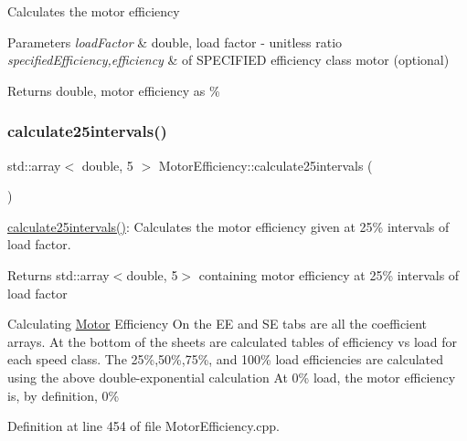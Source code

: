 Calculates the motor efficiency 
\begin{DoxyParams}{Parameters}
{\em load\+Factor} & double, load factor -\/ unitless ratio \\
\hline
{\em specified\+Efficiency,efficiency} & of S\+P\+E\+C\+I\+F\+I\+ED efficiency class motor (optional) \\
\hline
\end{DoxyParams}
\begin{DoxyReturn}{Returns}
double, motor efficiency as \% 
\end{DoxyReturn}
\mbox{\label{class_motor_efficiency_a4135d26efe506365d9ecb7c15f43f35d}} 
\subsubsection{\texorpdfstring{calculate25intervals()}{calculate25intervals()}\hspace{0.1cm}{\footnotesize\ttfamily [1/3]}}
{\footnotesize\ttfamily std\+::array$<$ double, 5 $>$ Motor\+Efficiency\+::calculate25intervals (\begin{DoxyParamCaption}{ }\end{DoxyParamCaption})}

\hyperlink{class_motor_efficiency_a4135d26efe506365d9ecb7c15f43f35d}{calculate25intervals()}\+: Calculates the motor efficiency given at 25\% intervals of load factor. \begin{DoxyReturn}{Returns}
std\+::array$<$double, 5$>$ containing motor efficiency at 25\% intervals of load factor 
\end{DoxyReturn}
Calculating \hyperlink{struct_motor}{Motor} Efficiency On the EE and SE tabs are all the coefficient arrays. At the bottom of the sheets are calculated tables of efficiency vs load for each speed class. The 25\%,50\%,75\%, and 100\% load efficiencies are calculated using the above double-\/exponential calculation At 0\% load, the motor efficiency is, by definition, 0\%

Definition at line 454 of file Motor\+Efficiency.\+cpp.

\mbox{\label{class_motor_efficiency_ac2bd043e7da0bea7e78b31528d1951a9}} 
